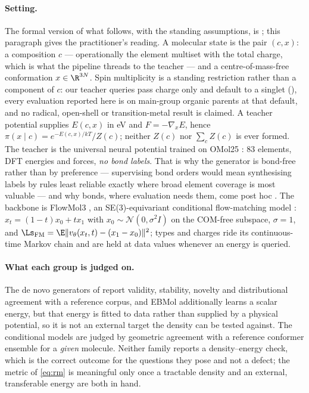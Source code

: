 \paragraph{Setting.} The formal version of what follows, with the standing
assumptions, is ; this paragraph gives the practitioner's reading. A
molecular state is the pair $(c,x)$: a composition $c$ --- operationally the element
multiset with the total charge, which is what the pipeline threads to the teacher ---
and a centre-of-mass-free conformation $x \in \R^{3N}$. Spin multiplicity is a standing
restriction rather than a component of $c$: our teacher queries pass charge only and
default to a singlet (), every evaluation reported here is on
main-group organic parents at that default, and no radical, open-shell or
transition-metal result is claimed. A teacher potential supplies
$E(c,x)$ in eV and $F = -\nabla_x E$, hence $\pi(x \mid c) = e^{-E(c,x)/kT}/Z(c)$;
neither $Z(c)$ nor $\sum_c Z(c)$ is ever formed. The teacher is the universal neural
potential trained on OMol25 \citep{omol25,esen}: 83 elements, DFT energies and forces,
\emph{no bond labels}. That is why the generator is bond-free rather than by
preference --- supervising bond orders would mean synthesising labels by rules least
reliable exactly where broad element coverage is most valuable --- and why bonds, where
evaluation needs them, come post hoc \citep{xyz2mol}. The backbone is FlowMol3
\citep{flowmol3}, an SE(3)-equivariant conditional flow-matching model
\citep{lipman2023flowmatching,liu2023rectifiedflow,albergo2023interpolants}:
$x_t = (1-t)x_0 + t x_1$ with $x_0 \sim \mathcal{N}(0,\sigma^2 I)$ on the COM-free
subspace, $\sigma = 1$, and
$\Ls_{\mathrm{FM}} = \E\lVert v_\theta(x_t,t) - (x_1 - x_0)\rVert^2$; types and charges
ride its continuous-time Markov chain and are held at data values whenever an energy is
queried.

\paragraph{What each group is judged on.} The de novo generators of 
\citep{edm,geoldm,midi,symphony,semlaflow,flowmol3,zatom1} report validity, stability, novelty and
distributional agreement with a reference corpus, and EBMol \citep{ebmol} additionally learns a
scalar energy, but that energy is fitted to data rather than supplied by a physical potential, so it
is not an external target the density can be tested against. The conditional models
\citep{torsionaldiff,geom,decaf} are judged by geometric agreement with a reference conformer
ensemble for a \emph{given} molecule. Neither family reports a density--energy check, which is the
correct outcome for the questions they pose and not a defect; the metric of \eqref{eq:rm} is
meaningful only once a tractable density and an external, transferable energy are both in hand.

